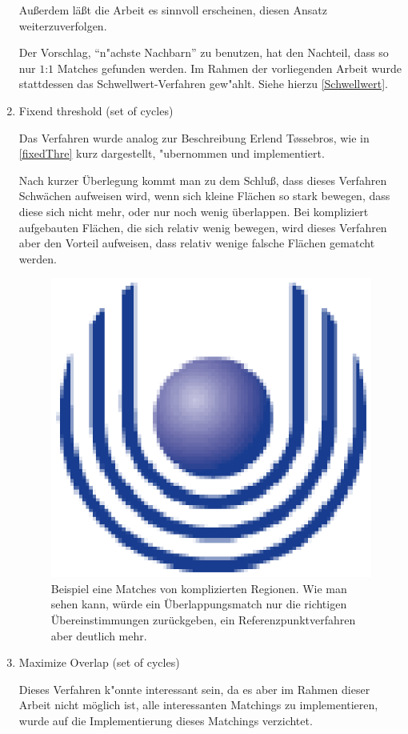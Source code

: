 \begin{enumerate}
Außerdem läßt die Arbeit \cite{AFRW} es sinnvoll erscheinen, diesen Ansatz weiterzuverfolgen.

Der Vorschlag, "`n"achste Nachbarn"' zu benutzen, hat den Nachteil, dass so nur $1$:$1$ Matches gefunden werden. Im Rahmen der vorliegenden Arbeit wurde stattdessen das Schwellwert-Verfahren gew"ahlt. Siehe hierzu \vref{Schwellwert}.

\item Fixend threshold (set of cycles)

Das Verfahren wurde analog zur Beschreibung Erlend T\o{}ssebros, wie in \vref{fixedThre} kurz dargestellt, "ubernommen und implementiert. 

Nach kurzer Überlegung kommt man zu dem Schluß, dass dieses Verfahren Schwächen aufweisen wird, wenn sich kleine Flächen so stark bewegen, dass diese sich nicht mehr, oder nur noch wenig überlappen. Bei kompliziert aufgebauten Flächen, die sich relativ wenig bewegen, wird dieses Verfahren aber den Vorteil aufweisen, dass relativ wenige falsche Flächen gematcht werden.

\begin{figure}
	\centering
	\includegraphics{feu_logo2.eps}
	\caption[Beispiel für den Vorteil des Overlaping-Match]{Beispiel eine Matches von komplizierten Regionen. Wie man sehen kann, würde ein Überlappungsmatch nur die richtigen Übereinstimmungen zurückgeben, ein Referenzpunktverfahren aber deutlich mehr.}
	\label{fig:OverlapVorteil}
\end{figure}


\item Maximize Overlap (set of cycles)

Dieses Verfahren k"onnte interessant sein, da es aber im  Rahmen dieser Arbeit nicht möglich ist, alle interessanten Matchings zu implementieren, wurde auf die Implementierung dieses Matchings verzichtet.

\end{enumerate}

